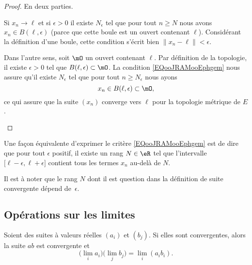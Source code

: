 \begin{proof}
	En deux parties.
	\begin{subproof}
		Si \( x_n\to \ell\) et si \( \epsilon>0\) il existe \( N_{\epsilon}\) tel que pour tout \( n\geq N\) nous avons \( x_n\in B(\ell,\epsilon)\) (parce que cette boule est un ouvert contenant \( \ell\)). Considérant la définition d'une boule, cette condition s'écrit bien \( \| x_n-\ell \|<\epsilon\).

		Dans l'autre sens, soit \( \mO\) un ouvert contenant \( \ell\). Par définition de la topologie, il existe \( \epsilon>0\) tel que \( B(\ell,\epsilon)\subset \mO\). La condition \eqref{EQooJRAMooEphgem} nous assure qu'il existe \( N_{\epsilon} \) tel que pour tout \( n\geq N_{\epsilon}\) nous ayons
		\begin{equation}
			x_n\in B(\ell,\epsilon)\subset\mO,
		\end{equation}
		ce qui assure que la suite \( (x_n)\) converge vers \( \ell\) pour la topologie métrique de \( E\).
	\end{subproof}
\end{proof}

Une façon équivalente d'exprimer le critère \eqref{EQooJRAMooEphgem} est de dire que pour tout \( \epsilon\) positif, il existe un rang \( N\in\eR\) tel que l'intervalle \( \mathopen[ \ell-\epsilon , \ell+\epsilon \mathclose]\) contient tous les termes \( x_n\) au-delà de \( N\).

Il est à noter que le rang \( N\) dont il est question dans la définition de suite convergente dépend de~\( \epsilon\).

\subsection{Opérations sur les limites}

\begin{proposition}     \label{PROPooIQOAooJPMoDD}
	Soient des suites à valeurs réelles \( (a_i)\) et \( (b_j)\). Si elles sont convergentes, alors la suite \( ab\) est convergente et
	\begin{equation}
		\big( \lim_ia_i \big)\big( \lim_jb_j \big)=\lim_i(a_ib_i).
	\end{equation}
\end{proposition}

